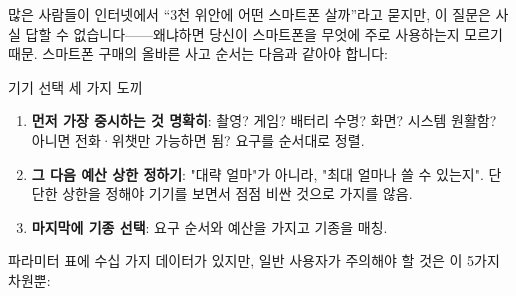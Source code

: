 


많은 사람들이 인터넷에서 “3천 위안에 어떤 스마트폰 살까”라고 묻지만, 이 질문은 사실 답할 수 없습니다——왜냐하면 당신이 스마트폰을 무엇에 주로 사용하는지 모르기 때문. 스마트폰 구매의 올바른 사고 순서는 다음과 같아야 합니다:

\begin{tcbinfo}{기기 선택 세 가지 도끼}
\begin{enumerate}
  \item \textbf{먼저 가장 중시하는 것 명확히}: 촬영? 게임? 배터리 수명? 화면? 시스템 원활함? 아니면 전화·위챗만 가능하면 됨? 요구를 순서대로 정렬.
  \item \textbf{그 다음 예산 상한 정하기}: "대략 얼마"가 아니라, "최대 얼마나 쓸 수 있는지". 단단한 상한을 정해야 기기를 보면서 점점 비싼 것으로 가지를 않음.
  \item \textbf{마지막에 기종 선택}: 요구 순서와 예산을 가지고 기종을 매칭.
\end{enumerate}

\end{tcbinfo}


파라미터 표에 수십 가지 데이터가 있지만, 일반 사용자가 주의해야 할 것은 이 5가지 차원뿐:

